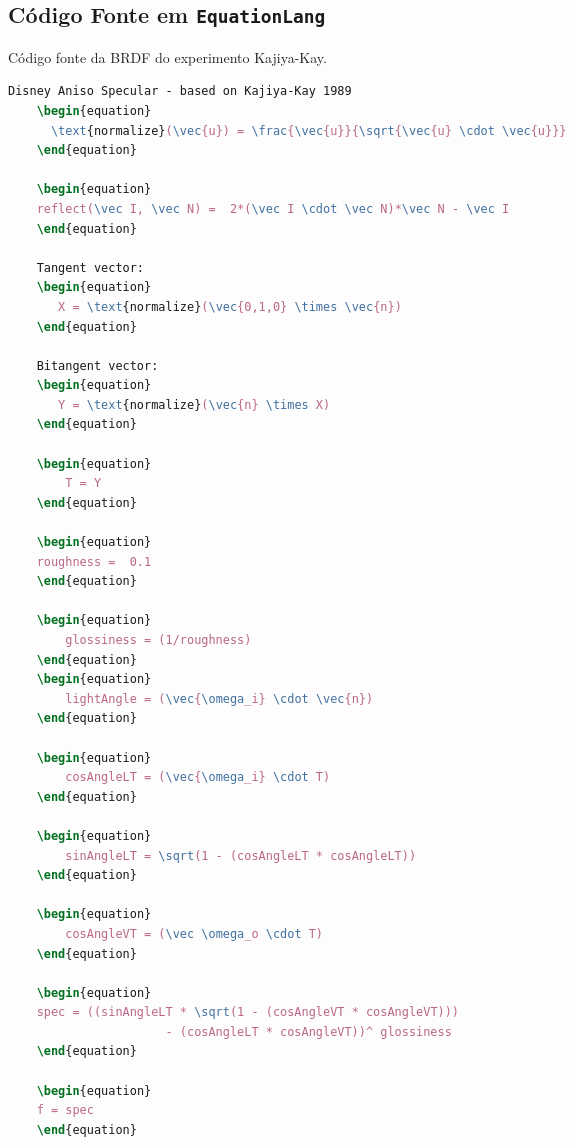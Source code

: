 \subsection{Código Fonte em \texttt{EquationLang}}
\begin{codigo}[H]
    \caption{\small Código fonte da BRDF do experimento Kajiya-Kay.}
    \label{cod-kajiya-eqlang}
\begin{lstlisting}[language=tex, frame=none, inputencoding=utf8]
    Disney Aniso Specular - based on Kajiya-Kay 1989
    \begin{equation}
      \text{normalize}(\vec{u}) = \frac{\vec{u}}{\sqrt{\vec{u} \cdot \vec{u}}}
    \end{equation}

    \begin{equation}
    reflect(\vec I, \vec N) =  2*(\vec I \cdot \vec N)*\vec N - \vec I
    \end{equation}

    Tangent vector:
    \begin{equation}
       X = \text{normalize}(\vec{0,1,0} \times \vec{n})
    \end{equation}

    Bitangent vector:
    \begin{equation}
       Y = \text{normalize}(\vec{n} \times X)
    \end{equation}

    \begin{equation}
        T = Y
    \end{equation}

    \begin{equation}
    roughness =  0.1
    \end{equation}

    \begin{equation}
        glossiness = (1/roughness)
    \end{equation}
    \begin{equation}
        lightAngle = (\vec{\omega_i} \cdot \vec{n})
    \end{equation}

    \begin{equation}
        cosAngleLT = (\vec{\omega_i} \cdot T)
    \end{equation}

    \begin{equation}
        sinAngleLT = \sqrt(1 - (cosAngleLT * cosAngleLT))
    \end{equation}

    \begin{equation}
        cosAngleVT = (\vec \omega_o \cdot T)
    \end{equation}

    \begin{equation}
    spec = ((sinAngleLT * \sqrt(1 - (cosAngleVT * cosAngleVT)))
                      - (cosAngleLT * cosAngleVT))^ glossiness
    \end{equation}

    \begin{equation}
    f = spec
    \end{equation}
\end{lstlisting}
\end{codigo}

